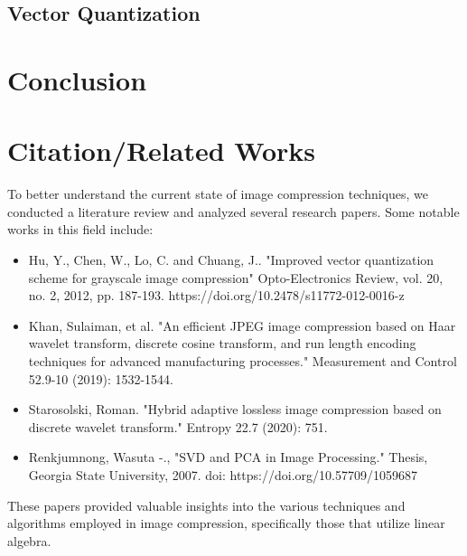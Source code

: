 \documentclass{article}
\begin{document}
\subsection{Vector Quantization}

\section{Conclusion}

\section{Citation/Related Works}
To better understand the current state of image compression techniques, we conducted a literature review and analyzed several research papers. Some notable works in this field include:
\begin{itemize}
    \item Hu, Y., Chen, W., Lo, C. and Chuang, J.. "Improved vector quantization scheme for grayscale image compression" Opto-Electronics Review, vol. 20, no. 2, 2012, pp. 187-193. https://doi.org/10.2478/s11772-012-0016-z
    \item Khan, Sulaiman, et al. "An efficient JPEG image compression based on Haar wavelet transform, discrete cosine transform, and run length encoding techniques for advanced manufacturing processes." Measurement and Control 52.9-10 (2019): 1532-1544.
    \item Starosolski, Roman. "Hybrid adaptive lossless image compression based on discrete wavelet transform." Entropy 22.7 (2020): 751.
    \item Renkjumnong, Wasuta -., "SVD and PCA in Image Processing." Thesis, Georgia State University, 2007.
    doi: https://doi.org/10.57709/1059687 
\end{itemize}
These papers provided valuable insights into the various techniques and algorithms employed in image compression, specifically those that utilize linear algebra.
\end{document}
